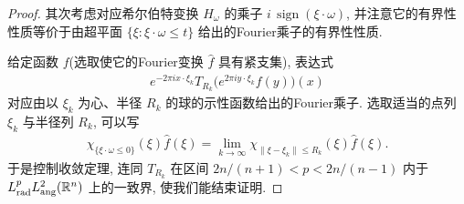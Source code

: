\begin{proof}
其次考虑对应希尔伯特变换 $H_{\omega}$ 的乘子 $i\,\operatorname{sign}(\xi\cdot\omega)$, 并注意它的有界性性质等价于由超平面 $\{\xi : \xi\cdot\omega \leq t\}$ 给出的Fourier乘子的有界性性质.

给定函数 $f$(选取使它的Fourier变换 $\widehat{f}$ 具有紧支集), 表达式
\begin{align*}
  e^{-2\pi i x\cdot\xi_{k}}T_{R_{k}}\bigl(e^{2\pi i y\cdot\xi_{k}}f(y)\bigr)(x)
\end{align*}
对应由以 $\xi_{k}$ 为心、半径 $R_{k}$ 的球的示性函数给出的Fourier乘子. 选取适当的点列 $\xi_{k}$ 与半径列 $R_{k}$, 可以写
\begin{align*}
  \chi_{\{\xi\cdot\omega\leq 0\}}(\xi)\widehat{f}(\xi)
  =\lim_{k\to\infty}\chi_{\|\xi-\xi_{k}\|\leq R_{k}}(\xi)\widehat{f}(\xi).
\end{align*}
于是控制收敛定理, 连同 $T_{R_k}$ 在区间 $2n/(n+1) < p < 2n/(n-1)$ 内于 $L_{\mathrm{rad}}^{p}L_{\mathrm{ang}}^{2}(\mathbb{R}^{n})$ 上的一致界, 使我们能结束证明.
\end{proof}


